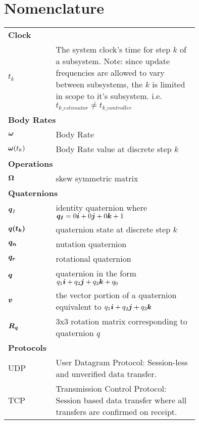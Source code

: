 \vspace*{0.5in}
    \thispagestyle{plain}
    \chapter*{Nomenclature}

\begin{tabular}{lp{0.75\linewidth}}
  \multicolumn{2}{l}{\textbf{Clock}} \\
  $t_k$ & The system clock's time for step $k$ of a subsystem.  Note: since update frequencies are allowed to vary between subsystems, the $k$ is limited in scope to it's subsystem.  i.e. $t_{k\_estimator} \ne t_{k\_controller}$ \\

  \multicolumn{2}{l}{\textbf{Body Rates}} \\
  $\boldsymbol{\omega}$ & Body Rate \\
  $\boldsymbol{\omega}(t_k)$ & Body Rate value at discrete step $k$\\


  \multicolumn{2}{l}{\textbf{Operations}} \\
  $\boldsymbol{\Omega}$ & skew symmetric matrix \\

  \multicolumn{2}{l}{\textbf{Quaternions}} \\
  $\boldsymbol{q}_I$ & identity quaternion where $\boldsymbol{q_I} = 0\boldsymbol{i}+0\boldsymbol{j}+0\boldsymbol{k}+1$ \\
  $\boldsymbol{q(t_k)}$ & quaternion state at discrete step $k$ \\
  $\boldsymbol{q_n}$ & nutation quaternion \\
  $\boldsymbol{q_r}$ & rotational quaternion \\
  $\boldsymbol{q}$ & quaternion in the form $q_1\boldsymbol{i}+q_2\boldsymbol{j}+q_3\boldsymbol{k}+q_0$ \\
  $\boldsymbol{v}$ & the vector portion of a quaternion equivalent to $q_1\boldsymbol{i}+q_2\boldsymbol{j}+q_3\boldsymbol{k}$ \\
  $\boldsymbol{R_q}$ & 3x3 rotation matrix corresponding to quaternion $q$ \\

  \multicolumn{2}{l}{\textbf{Protocols}} \\
  UDP & User Datagram Protocol: Session-less and unverified data transfer. \\
  TCP & Transmission Control Protocol: Session based data transfer where all transfers are confirmed on receipt. \\
\end{tabular}



